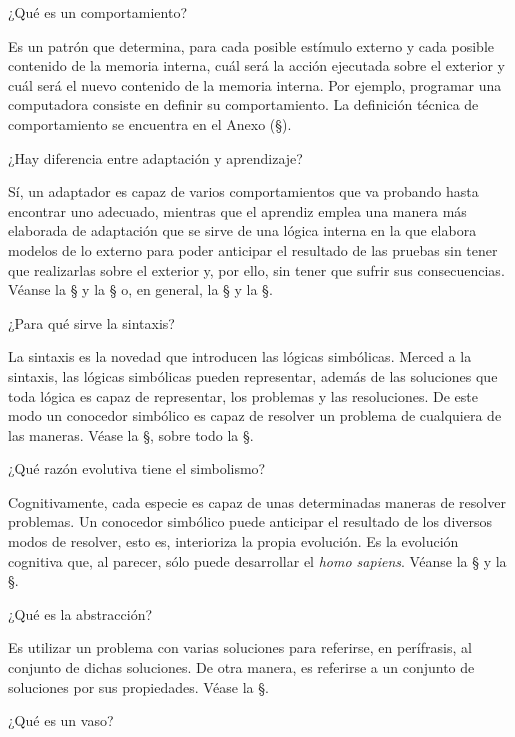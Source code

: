 \Q ¿Qué es un comportamiento?

Es un patrón que determina, para cada posible estímulo externo y cada
posible contenido de la memoria interna, cuál será la acción ejecutada sobre
el exterior y cuál será el nuevo contenido de la memoria interna. Por
ejemplo, programar una computadora consiste en definir su comportamiento. La
definición técnica de comportamiento se encuentra en el Anexo  (\S{}).

\Q ¿Hay diferencia entre adaptación y aprendizaje?

Sí, un adaptador es capaz de varios comportamientos que va probando hasta
encontrar uno adecuado, mientras que el aprendiz emplea una manera más
elaborada de adaptación que se sirve de una lógica interna en la que elabora
modelos de lo externo para poder anticipar el resultado de las pruebas sin
tener que realizarlas sobre el exterior y, por ello, sin tener que sufrir
sus consecuencias.  Véanse la \S{} y la
\S{} o, en general, la \S{} y la
\S{}.

\Q ¿Para qué sirve la sintaxis?

La sintaxis es la novedad que introducen las lógicas simbólicas. Merced a la
sintaxis, las lógicas simbólicas pueden representar, además de las
soluciones que toda lógica es capaz de representar, los problemas y las
resoluciones.  De este modo un conocedor simbólico es capaz de resolver un
problema de cualquiera de las maneras.  Véase la \S{},
sobre todo la \S{}.

\Q ¿Qué razón evolutiva tiene el simbolismo?

Cognitivamente, cada especie es capaz de unas determinadas maneras de
resolver problemas.  Un conocedor simbólico puede anticipar el resultado de
los diversos modos de resolver, esto es, interioriza la propia evolución. Es
la evolución cognitiva que, al parecer, sólo puede desarrollar el {\it homo
sapiens}.  Véanse la \S{} y la
\S{}.

\Q ¿Qué es la abstracción?

Es utilizar un problema con varias soluciones para referirse, en perífrasis,
al conjunto de dichas soluciones.  De otra manera, es referirse a un
conjunto de soluciones por sus propiedades.  Véase la \S{}.

\Q ¿Qué es un vaso?

